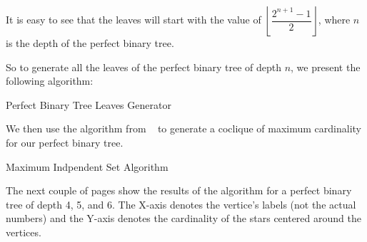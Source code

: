 \documentclass{amsart}
\theoremstyle{definition}
\begin{document}
\begin{appendix}
It is easy to see that the leaves will start with the value of $\left\lfloor\dfrac{2^{n + 1} - 1}{2}\right\rfloor$, where $n$ is the depth of the perfect binary tree.

\newpage
So to generate all the leaves of the perfect binary tree of depth $n$, we present the following algorithm:

\begin{algorithm}[hbt!]
  \caption{Perfect Binary Tree Leaves Generator}\label{alg:leaves-generator}


\end{algorithm}

We then use the algorithm from ~\cite{Niskanen2003CliquerUG} to generate a coclique of maximum cardinality for our perfect binary tree.

\begin{algorithm}[hbt!]
  \caption{Maximum Indpendent Set Algorithm}\label{alg:max-independent-set}


\end{algorithm}


The next couple of pages show the results of the algorithm for a perfect binary tree of depth 4, 5, and 6. The X-axis denotes the vertice's labels (not the actual numbers) and the Y-axis denotes the cardinality of the stars centered around the vertices.


\end{appendix}
\end{document}
